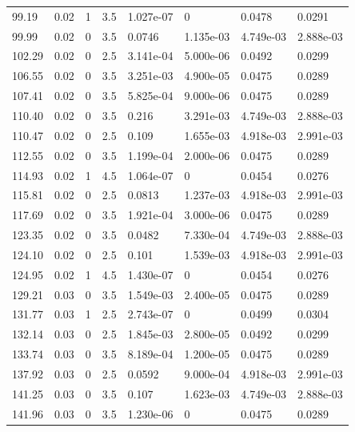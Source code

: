 \documentclass[preview]{standalone}
\begin{document}
{{{\begin{tabular}{L{1.2cm}C{1.2cm} C{0.3cm}C{0.5cm} C{1.4cm}C{1.4cm} C{1.4cm}C{1.4cm}}
  99.19  &  0.02  & 1     & 3.5 &  1.027e-07  & 0  & 0.0478 &  0.0291   \\ 
  99.99  &  0.02  & 0     & 3.5 &  0.0746  & 1.135e-03  & 4.749e-03 &  2.888e-03   \\ 
  102.29  &  0.02  & 0     & 2.5 &  3.141e-04  & 5.000e-06  & 0.0492 &  0.0299   \\ 
  106.55  &  0.02  & 0     & 3.5 &  3.251e-03  & 4.900e-05  & 0.0475 &  0.0289   \\ 
  107.41  &  0.02  & 0     & 3.5 &  5.825e-04  & 9.000e-06  & 0.0475 &  0.0289   \\ 
  110.40  &  0.02  & 0     & 3.5 &  0.216  & 3.291e-03  & 4.749e-03 &  2.888e-03   \\ 
  110.47  &  0.02  & 0     & 2.5 &  0.109  & 1.655e-03  & 4.918e-03 &  2.991e-03   \\ 
  112.55  &  0.02  & 0     & 3.5 &  1.199e-04  & 2.000e-06  & 0.0475 &  0.0289   \\ 
  114.93  &  0.02  & 1     & 4.5 &  1.064e-07  & 0  & 0.0454 &  0.0276   \\ 
  115.81  &  0.02  & 0     & 2.5 &  0.0813  & 1.237e-03  & 4.918e-03 &  2.991e-03   \\ 
  117.69  &  0.02  & 0     & 3.5 &  1.921e-04  & 3.000e-06  & 0.0475 &  0.0289   \\ 
  123.35  &  0.02  & 0     & 3.5 &  0.0482  & 7.330e-04  & 4.749e-03 &  2.888e-03   \\ 
  124.10  &  0.02  & 0     & 2.5 &  0.101  & 1.539e-03  & 4.918e-03 &  2.991e-03   \\ 
  124.95  &  0.02  & 1     & 4.5 &  1.430e-07  & 0  & 0.0454 &  0.0276   \\ 
  129.21  &  0.03  & 0     & 3.5 &  1.549e-03  & 2.400e-05  & 0.0475 &  0.0289   \\ 
  131.77  &  0.03  & 1     & 2.5 &  2.743e-07  & 0  & 0.0499 &  0.0304   \\ 
  132.14  &  0.03  & 0     & 2.5 &  1.845e-03  & 2.800e-05  & 0.0492 &  0.0299   \\ 
  133.74  &  0.03  & 0     & 3.5 &  8.189e-04  & 1.200e-05  & 0.0475 &  0.0289   \\ 
  137.92  &  0.03  & 0     & 2.5 &  0.0592  & 9.000e-04  & 4.918e-03 &  2.991e-03   \\ 
  141.25  &  0.03  & 0     & 3.5 &  0.107  & 1.623e-03  & 4.749e-03 &  2.888e-03   \\ 
  141.96  &  0.03  & 0     & 3.5 &  1.230e-06  & 0  & 0.0475 &  0.0289   \\ 

\end{tabular}}}}
\end{document}
